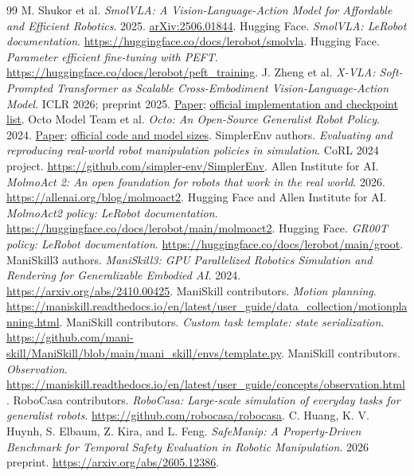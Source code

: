 \documentclass[11pt]{article}
\begin{document}
\begin{thebibliography}{99}
\small
{} M. Shukor et al. \emph{SmolVLA: A Vision-Language-Action Model for Affordable and Efficient Robotics}. 2025. \href{https://arxiv.org/abs/2506.01844}{arXiv:2506.01844}.
 Hugging Face. \emph{SmolVLA: LeRobot documentation}. \url{https://huggingface.co/docs/lerobot/smolvla}.
 Hugging Face. \emph{Parameter efficient fine-tuning with PEFT}. \url{https://huggingface.co/docs/lerobot/peft_training}.
 J. Zheng et al. \emph{X-VLA: Soft-Prompted Transformer as Scalable Cross-Embodiment Vision-Language-Action Model}. ICLR 2026; preprint 2025. \href{https://arxiv.org/abs/2510.10274}{Paper}; \href{https://github.com/2toinf/X-VLA}{official implementation and checkpoint list}.
 Octo Model Team et al. \emph{Octo: An Open-Source Generalist Robot Policy}. 2024. \href{https://arxiv.org/abs/2405.12213}{Paper}; \href{https://github.com/octo-models/octo}{official code and model sizes}.
 SimplerEnv authors. \emph{Evaluating and reproducing real-world robot manipulation policies in simulation}. CoRL 2024 project. \url{https://github.com/simpler-env/SimplerEnv}.
 Allen Institute for AI. \emph{MolmoAct 2: An open foundation for robots that work in the real world}. 2026. \url{https://allenai.org/blog/molmoact2}.
 Hugging Face and Allen Institute for AI. \emph{MolmoAct2 policy: LeRobot documentation}. \url{https://huggingface.co/docs/lerobot/main/molmoact2}.
 Hugging Face. \emph{GR00T policy: LeRobot documentation}. \url{https://huggingface.co/docs/lerobot/main/groot}.
 ManiSkill3 authors. \emph{ManiSkill3: GPU Parallelized Robotics Simulation and Rendering for Generalizable Embodied AI}. 2024. \url{https://arxiv.org/abs/2410.00425}.
 ManiSkill contributors. \emph{Motion planning}. \url{https://maniskill.readthedocs.io/en/latest/user_guide/data_collection/motionplanning.html}.
 ManiSkill contributors. \emph{Custom task template: state serialization}. \url{https://github.com/mani-skill/ManiSkill/blob/main/mani_skill/envs/template.py}.
 ManiSkill contributors. \emph{Observation}. \url{https://maniskill.readthedocs.io/en/latest/user_guide/concepts/observation.html}.
 RoboCasa contributors. \emph{RoboCasa: Large-scale simulation of everyday tasks for generalist robots}. \url{https://github.com/robocasa/robocasa}.
 C. Huang, K. V. Huynh, S. Elbaum, Z. Kira, and L. Feng. \emph{SafeManip: A Property-Driven Benchmark for Temporal Safety Evaluation in Robotic Manipulation}. 2026 preprint. \url{https://arxiv.org/abs/2605.12386}.

\end{thebibliography}
\end{document}
